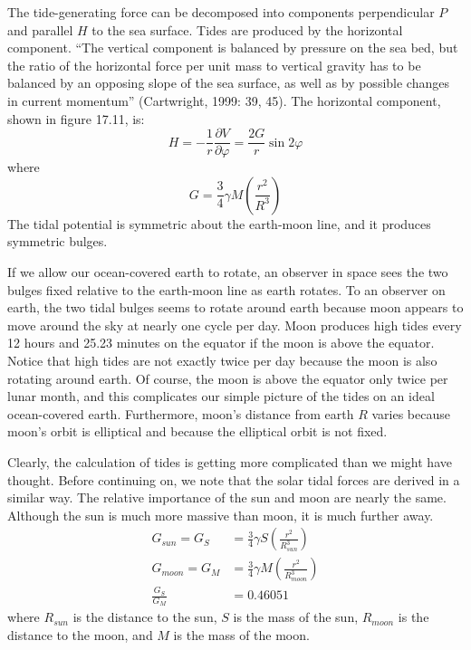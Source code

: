 The tide-generating force can be decomposed into components perpendicular $P$ and
parallel $H$ to the sea surface. Tides are produced by the horizontal component. ``The
vertical component is balanced by pressure on the sea bed, but the ratio of the horizontal
force per unit mass to vertical gravity has to be balanced by an opposing slope of the sea
surface, as well as by possible changes in current momentum'' (Cartwright,
1999: 39, 45). The horizontal component, shown in figure 17.11, is:
\begin{equation}
H = - \frac{1}{r} \frac{\partial V}{\partial\varphi} = \frac{2 G}{r} \sin
2\varphi
\end{equation}
where
\begin{equation}
G = \frac{3}{4} \gamma M \left( \frac{r^{2}}{R^{3}} \right)
\end{equation}
The tidal potential is symmetric about the earth-moon line, and it produces
symmetric bulges.

If we allow our ocean-covered earth to rotate, an observer in space sees the two
bulges fixed relative to the earth-moon line as earth rotates. To an observer on
earth, the two tidal bulges seems to rotate around earth because moon appears to
move around the sky at nearly one cycle per day. Moon produces high tides every 12
hours and 25.23 minutes on the equator if the moon is above the equator. Notice that
high tides are not exactly twice per day because the moon is also rotating around
earth. Of course, the moon is above the equator only twice per lunar month, and this
complicates our simple picture of the tides on an ideal ocean-covered earth.
Furthermore, moon's distance from earth $R$ varies because moon's orbit is
elliptical and because the elliptical orbit is not fixed.

Clearly, the calculation of tides is getting more complicated than we might have
thought. Before continuing on, we note that the solar tidal forces are derived in a
similar way. The relative importance of the sun and moon are nearly the same.
Although the sun is much more massive than moon, it is much further away.
\begin{align}
G_{sun}     = G_{S} &= \frac{3}{4} \gamma S \left( \frac{r^{2}}{R_{sun}^{3}} \right) \\
G_{moon}    = G_{M} &= \frac{3}{4} \gamma M \left( \frac{r^{2}}{R_{moon}^{3}} \right) \\
\frac{G_{S}}{G_{M}} &= 0.46051
\end{align}
where $R_{sun}$ is the distance to the sun,  $S$ is the mass of the sun, $R_{moon}$
is the distance to the moon, and $M$ is the mass of the moon.


